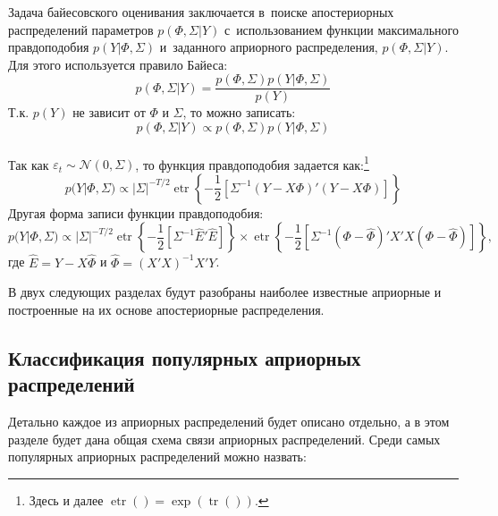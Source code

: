 \documentclass[11pt]{article} %
\DeclareMathOperator{\etr}{etr}
\DeclareMathOperator{\tr}{tr}
\newcommand{\cN}{\mathcal{N}}
\begin{document}
Задача байесовского оценивания заключается в~поиске апостериорных распределений параметров $p(\Phi, \Sigma|Y)$ с~использованием функции максимального правдоподобия $p(Y|\Phi, \Sigma)$ и~заданного априорного распределения, $p(\Phi, \Sigma|Y)$. Для этого используется правило Байеса:
\begin{equation}
p(\Phi, \Sigma|Y)=\frac{p(\Phi,\Sigma) p(Y|\Phi,\Sigma)}{p(Y)}
\end{equation}
Т.к. $p(Y)$ не зависит от $\Phi$ и $\Sigma$, то можно записать:
\begin{equation}
p(\Phi, \Sigma|Y)\propto p(\Phi,\Sigma) p(Y|\Phi,\Sigma)
\end{equation}\\
Так как $\varepsilon_t\sim \cN(0,\Sigma)$, то функция правдоподобия задается как:\footnote{Здесь и далее $\etr()=\exp(\tr())$.}
\begin{equation}
p(Y|\Phi, \Sigma) \propto |\Sigma|^{-T/2}\etr\left\lbrace -\frac{1}{2}  \left[\Sigma^{-1}(Y-X\Phi)'(Y-X\Phi)\right]\right\rbrace\label{likelihood}
\end{equation}
Другая форма записи функции правдоподобия:
\begin{equation}
p(Y|\Phi, \Sigma) \propto |\Sigma|^{-T/2}\etr\left\lbrace -\frac{1}{2}  \left[\Sigma^{-1} \hat E' \hat E\right]\right\rbrace \times \etr\left\lbrace -\frac{1}{2}  \left[\Sigma^{-1}(\Phi-\hat\Phi)'X'X(\Phi-\hat\Phi)\right]\right\rbrace,
\end{equation}
где $\hat E=Y-X\hat\Phi$ и $\hat \Phi=(X'X)^{-1}X'Y$.

В двух следующих разделах будут разобраны наиболее известные априорные и построенные на их основе апостериорные распределения.


\subsection{Классификация популярных априорных распределений}

Детально каждое из априорных распределений будет описано отдельно, а в
этом разделе будет дана общая схема связи априорных распределений.
Среди самых популярных априорных распределений можно назвать:
\end{document}
